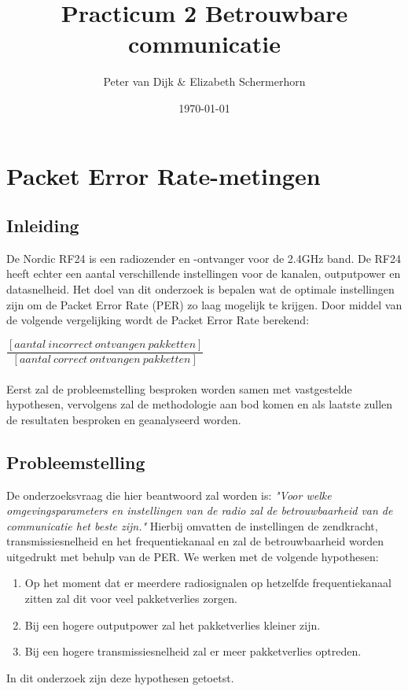 \documentclass{article}
\author{Peter van Dijk \& Elizabeth Schermerhorn}
\date{\today}
\title{Practicum 2 Betrouwbare communicatie}
\begin{document}
\maketitle
\newpage
\tableofcontents
\clearpage
\section{Packet Error Rate-metingen}
\subsection{Inleiding}
De Nordic RF24 is een radiozender en -ontvanger voor de 2.4GHz band. De RF24 heeft echter een aantal verschillende instellingen voor de kanalen, outputpower en datasnelheid. Het doel van dit onderzoek is bepalen wat de optimale instellingen zijn om de Packet Error Rate (PER) zo laag mogelijk te krijgen. Door middel van de volgende vergelijking wordt de Packet Error Rate berekend: 
\setlength{\parskip}{10pt plus 1pt minus 1pt}

$\dfrac {[aantal\ incorrect\ ontvangen\ pakketten]}{[aantal\ correct\ ontvangen\ pakketten]}$\\
\\
Eerst zal de probleemstelling besproken worden samen met vastgestelde hypothesen, vervolgens zal de methodologie aan bod komen en als laatste zullen de resultaten besproken en geanalyseerd worden. 

\subsection{Probleemstelling}
De onderzoeksvraag die hier beantwoord zal worden is: \textit{"Voor welke omgevingsparameters en instellingen van de radio zal de betrouwbaarheid van de communicatie het beste zijn."} Hierbij omvatten de instellingen de zendkracht, transmissiesnelheid en het frequentiekanaal en zal de betrouwbaarheid worden uitgedrukt met behulp van de PER. We werken met de volgende hypothesen: 
\begin{enumerate}
  \item Op het moment dat er meerdere radiosignalen op hetzelfde frequentiekanaal zitten zal dit voor veel pakketverlies zorgen.
  \item Bij een hogere outputpower zal het pakketverlies kleiner zijn.
  \item Bij een hogere transmissiesnelheid zal er meer pakketverlies optreden. 
\end{enumerate}
In dit onderzoek zijn deze hypothesen getoetst.
\end{document}
